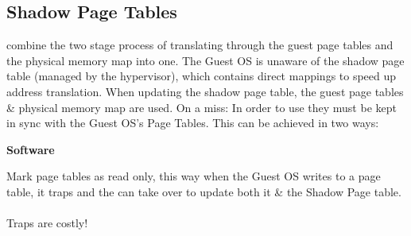 \documentclass{report}
\begin{document}
\subsection*{Shadow Page Tables}
 combine the two stage process of translating through the guest page tables and the physical memory map into one. The Guest OS is unaware of the shadow page table (managed by the hypervisor), which contains direct mappings to speed up address translation. When updating the shadow page table, the guest page tables \& physical memory map are used.
On a  miss:
In order to use  they must be kept in sync with the Guest OS's Page Tables. This can be achieved in two ways:
\\ \begin{minipage}[t]{0.45\textwidth}
	\centerline{\textbf{Software}}
	Mark page tables as read only, this way when the Guest OS writes
	to a page table, it traps and the  can take over to update both it \& the Shadow Page table.
	\\
	\\ Traps are costly!
\end{minipage}
\hfill
\end{document}
